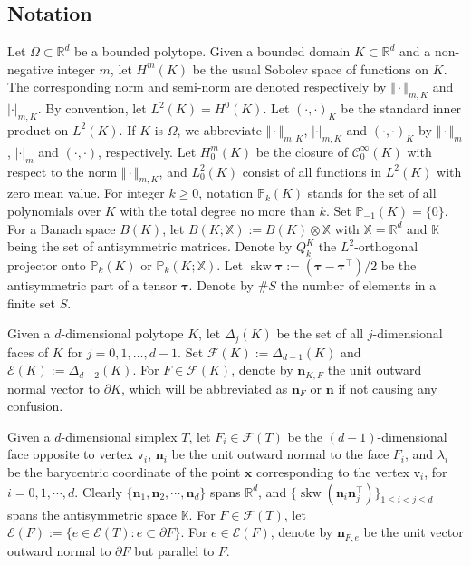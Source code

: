 \documentclass[10pt]{amsart}
\newcommand{\skw}{\operatorname{skw}}
\numberwithin{equation}{section}
\begin{document}
\subsection{Notation}
Let $\Omega\subset \mathbb{R}^d$ be a bounded
polytope. Given a bounded domain $K\subset\mathbb{R}^{d}$ and a
non-negative integer $m$, let $H^m(K)$ be the usual Sobolev space of functions
on $K$.
The corresponding norm and semi-norm are denoted respectively by
$\Vert\cdot\Vert_{m,K}$ and $|\cdot|_{m,K}$. By convention, let $L^2(K)=H^0(K)$. 
Let $(\cdot, \cdot)_K$ be the standard inner product on $L^2(K)$. If $K$ is $\Omega$, we abbreviate
$\Vert\cdot\Vert_{m,K}$, $|\cdot|_{m,K}$ and $(\cdot, \cdot)_K$ by $\Vert\cdot\Vert_{m}$, $|\cdot|_{m}$ and $(\cdot, \cdot)$,
respectively. Let $H_0^m(K)$ be the closure of $\mathcal C_{0}^{\infty}(K)$ with
respect to the norm $\Vert\cdot\Vert_{m,K}$, and $L_0^2(K)$ consist of all functions in $L^2(K)$ with zero mean value.
For integer $k\geq0$,
notation $\mathbb P_k(K)$ stands for the set of all
polynomials over $K$ with the total degree no more than $k$. Set $\mathbb P_{-1}(K)=\{0\}$.
For a Banach space $B(K)$, let $B(K; \mathbb{X}):=B(K)\otimes\mathbb{X}$ with $\mathbb{X}=\mathbb{R}^d$ and $\mathbb{K}$ being the set of antisymmetric matrices.
Denote by $Q_k^{K}$ the $L^2$-orthogonal projector onto $\mathbb P_k(K)$ or $\mathbb P_{k}(K; \mathbb{X})$.
Let $\skw\boldsymbol{\tau}:=(\boldsymbol{\tau}-\boldsymbol{\tau}^{\intercal})/2$ be the antisymmetric part of a tensor $\boldsymbol{\tau}$.
Denote by $\#S$ the number of elements in a finite set $S$.

Given a $d$-dimensional polytope $K$, let $\Delta_j(K)$ be the set of all $j$-dimensional faces of $K$ for $j=0,1,\ldots, d-1$. Set $\mathcal{F}(K):=\Delta_{d-1}(K)$ and $\mathcal{E}(K):=\Delta_{d-2}(K)$.
For $F\in\mathcal{F}(K)$, denote by $\boldsymbol{n}_{K,F}$ the unit outward normal vector to $\partial K$, which will be abbreviated as $\boldsymbol{n}_F$ or $\boldsymbol{n}$ if not causing any confusion.

Given a $d$-dimensional simplex $T$,
let $F_i\in\mathcal F(T)$ be the $(d-1)$-dimensional face opposite to vertex $\texttt{v}_i$, $\boldsymbol n_i$ be the unit outward normal to the face $F_i$, and $\lambda_i$ be the barycentric coordinate of the point $\boldsymbol x$ corresponding to the vertex $\texttt{v}_i$, for $i=0, 1, \cdots, d$.
Clearly $\{ \boldsymbol n_1, \boldsymbol n_2, \cdots, \boldsymbol n_d \}$ spans $\mathbb R^d$, and $\{\skw({\boldsymbol n_i\boldsymbol n_j^{\intercal}})\}_{1\leq i<j\leq d}$ spans the antisymmetric space $\mathbb K$. 
For $F\in\mathcal F(T)$, let $\mathcal{E}(F):=\{e\in\mathcal{E}(T): e\subset\partial F\}$.
For $e\in \mathcal E(F)$, denote by $\boldsymbol{n}_{F,e}$ be the unit vector outward normal to $\partial F$ but parallel to $F$.
\end{document}
